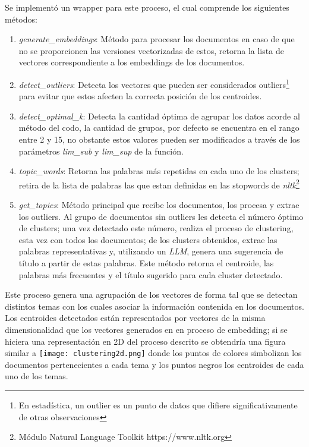     Se implementó un wrapper para este proceso, el cual comprende los siguientes métodos:
    \begin{enumerate}
        \item \emph{generate_embeddings}: Método para procesar los documentos en caso de que no se proporcionen las versiones vectorizadas de estos, retorna la lista de vectores correspondiente a los embeddings de los documentos.
        \item \emph{detect_outliers}: Detecta los vectores que pueden ser considerados outliers\footnote{En estadística, un outlier es un punto de datos que difiere significativamente de otras observaciones} para evitar que estos afecten la correcta posición de los centroides.
        \item \emph{detect_optimal_k}: Detecta la cantidad óptima de agrupar los datos acorde al método del codo, la cantidad de grupos, por defecto se encuentra en el rango entre 2 y 15, no obstante estos valores pueden ser modificados a través de los parámetros \emph{lim_sub} y \emph{lim_sup} de la función.
        \item \emph{topic_words}: Retorna las palabras más repetidas en cada uno de los clusters; retira de la lista de palabras las que estan definidas en las stopwords de \emph{nltk}\footnote{Módulo Natural Language Toolkit https://www.nltk.org}
        \item \emph{get_topics}: Método principal que recibe los documentos, los procesa y extrae los outliers. Al grupo de documentos sin outliers les detecta el número óptimo de clusters; una vez detectado este número, realiza el proceso de clustering, esta vez con todos los documentos; de los clusters obtenidos, extrae las palabras representativas y, utilizando un \emph{LLM}, genera una sugerencia de título a partir de estas palabras. Este método retorna el centroide, las palabras más frecuentes y el título sugerido para cada cluster detectado.
    \end{enumerate}

    Este proceso genera una agrupación de los vectores de forma tal que se detectan distintos temas con los cuales asociar la información contenida en los documentos. Los centroides detectados están representados por vectores de la misma dimensionalidad que los vectores generados en en proceso de embedding; si se hiciera una representación en 2D del proceso descrito se obtendría una figura similar a \texttt{[image: clustering2d.png]} donde los puntos de colores simbolizan los documentos pertenecientes a cada tema y los puntos negros los centroides de cada uno de los temas.

